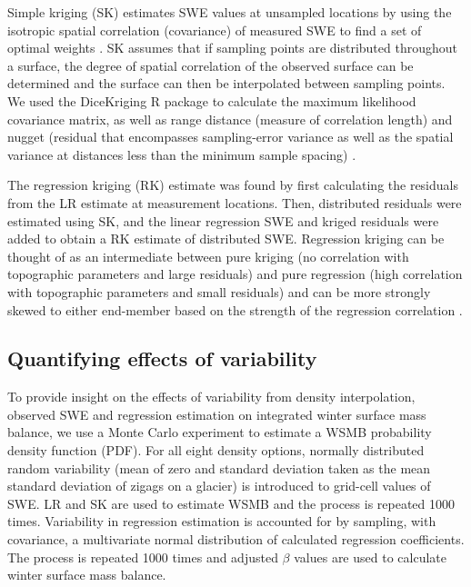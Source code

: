 \documentclass[twocolumn,letterpaper]{igs}
\begin{document}
Simple kriging (SK) estimates SWE values at unsampled locations by using the isotropic spatial correlation (covariance) of measured SWE to find a set of optimal weights \citep{Davis1986, Li2008}. SK assumes that if sampling points are distributed throughout a surface, the degree of spatial correlation of the observed surface can be determined and the surface can then be interpolated between sampling points. We used the DiceKriging R package \citep{Roustant2012} to calculate the maximum likelihood covariance matrix, as well as range distance (measure of correlation length) and nugget (residual that encompasses sampling-error variance as well as the spatial variance at distances less than the minimum sample spacing) \citep{Li2008}. 

The regression kriging (RK) \citep{Hengl2007} estimate was found by first calculating the residuals from the LR estimate at measurement locations. Then, distributed residuals were estimated using SK, and the linear regression SWE and kriged residuals were added to obtain a RK estimate of distributed SWE. Regression kriging can be thought of as an intermediate between pure kriging (no correlation with topographic parameters and large residuals) and pure regression (high correlation with topographic parameters and small residuals) and can be more strongly skewed to either end-member based on the strength of the regression correlation \citep{Hengl2007}.

\subsection{Quantifying effects of variability}

To provide insight on the effects of variability from density interpolation, observed SWE and regression estimation on integrated winter surface mass balance, we use a Monte Carlo experiment \citep{Metropolis1949} to estimate a WSMB probability density function (PDF). For all eight density options, normally distributed random variability (mean of zero and standard deviation taken as the mean standard deviation of zigags on a glacier) is introduced to grid-cell values of SWE. LR and SK are used to estimate WSMB and the process is repeated 1000 times.  Variability in regression estimation is accounted for by sampling, with covariance, a multivariate normal distribution of calculated regression coefficients. The process is repeated 1000 times and adjusted $\beta$ values are used to calculate winter surface mass balance. 
\end{document}
